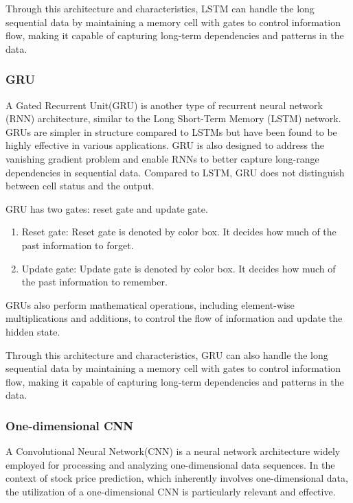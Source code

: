 Through this architecture and characteristics, LSTM can handle the long sequential data by maintaining a memory cell with gates to control information flow, 
making it capable of capturing long-term dependencies and patterns in the data.

\subsubsection{GRU}

A Gated Recurrent Unit(GRU) is another type of recurrent neural network (RNN) architecture, 
similar to the Long Short-Term Memory (LSTM) network. 
GRUs are simpler in structure compared to LSTMs but have been found to be highly effective in various applications. 
GRU is also designed to address the vanishing gradient problem and enable RNNs to better capture long-range dependencies in sequential data. 
Compared to LSTM, GRU does not distinguish between cell status and the output.

GRU has two gates: reset gate and update gate.
\begin{enumerate}
	\item Reset gate: Reset gate is denoted by color box. It decides how much of the past information to forget.
	\item Update gate: Update gate is denoted by color box. It decides how much of the past information to remember.
\end{enumerate}

GRUs also perform mathematical operations, including element-wise multiplications and additions, to control the flow of information and update the hidden state.

Through this architecture and characteristics, GRU can also handle the long sequential data by maintaining a memory cell with gates to control information flow, 
making it capable of capturing long-term dependencies and patterns in the data.


\subsubsection{One-dimensional CNN}

A Convolutional Neural Network(CNN) is a neural network architecture widely employed for processing and analyzing one-dimensional data sequences. 
In the context of stock price prediction, which inherently involves one-dimensional data, the utilization of a one-dimensional CNN is particularly relevant and effective.

